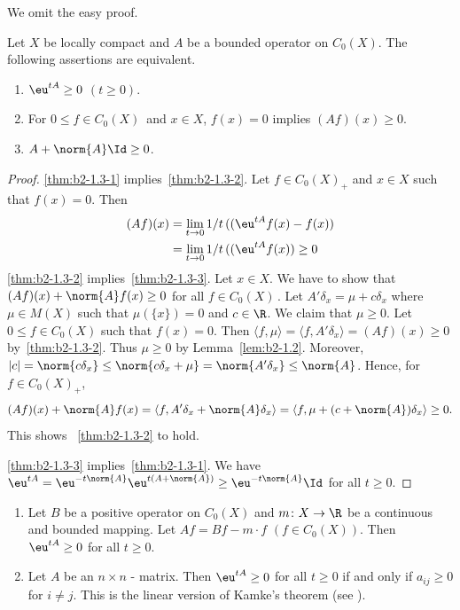 We omit the easy proof.
\begin{theorem}\label{thm:b2-1.3}
Let $X$ be locally compact and $A$ be a bounded operator on $C_{0}(X)$.
The following assertions are equivalent.
\begin{enumerate}[\upshape (a)]
\item \label{thm:b2-1.3-1}
$\eu^{tA} \geq 0$ $(t \geq 0)$.
\item \label{thm:b2-1.3-2}
For  $0 \leq f \in C_{0}(X)$\, and  $x \in X$,  $f(x) = 0$ implies $(Af)(x) \geq 0$.
\item \label{thm:b2-1.3-3}
$A + \norm{A}\Id \geq 0$.
\end{enumerate}
\end{theorem}
\begin{proof}
\ref{thm:b2-1.3-1} implies~\ref{thm:b2-1.3-2}.
Let $f \in C_{0}(X)_{+}$ and $x \in X$ such that $f(x) = 0$.
Then
\begin{align*}
(Af)(x) &= \lim_{t \to 0} 1/t\, ((\eu^{tA}f(x) - f(x)) \\
&= \lim_{t \to 0} 1/t\, ((\eu^{tA}f(x)) \geq 0
\end{align*}
\ref{thm:b2-1.3-2} implies~\ref{thm:b2-1.3-3}.
Let $x \in X$.
We have to show that $(Af)(x) + \norm{A}f(x) \geq 0$ for all $f \in C_{0}(X)$\,.
Let $A'\delta_{x} = \mu + c\delta_{x}$ where $\mu \in M(X)$ such that $\mu(\{x\}) = 0$ and $c \in \R$.
We claim that $\mu \geq 0$.
Let $0 \leq f \in C_{0}(X)$ such that $f(x) = 0$.
Then $\langle f,\mu \rangle = \langle f,A'\delta_{x} \rangle = (Af)(x) \geq 0$ by~\ref{thm:b2-1.3-2}.
Thus $\mu \geq 0$ by Lemma~\ref{lem:b2-1.2}.
Moreover, $|c| = \norm{c\delta_{x}} \leq \norm{c\delta_{x} + \mu} = \norm{A'\delta_{x}} \leq \norm{A}$.
Hence, for $f \in C_{0}(X)_{+}$,
\[
(Af)(x) + \norm{A}f(x) = \langle f, A'\delta_{x} + \norm{A}\delta_{x} \rangle = \langle f, \mu + (c+\norm{A})\delta_{x} \rangle \geq 0.
\]
This shows ~\ref{thm:b2-1.3-2} to hold.

\ref{thm:b2-1.3-3} implies~\ref{thm:b2-1.3-1}.
We have 
$\eu^{tA} = \eu^{-t\norm{A}}\eu^{t(A+\norm{A})} \geq \eu^{-t\norm{A}}\Id$ for all $t \geq 0$.
\end{proof}

\begin{example}\label{ex:b2-1.4} 
 
	\begin{enumerate}[\upshape (i), wide, labelindent=.5ex] 
		\item \label{ex:b2-1.4-1}
		Let $B$ be a positive operator on $C_{0}(X)$ and $m \colon X \to \R$ be a continuous and bounded mapping.
		Let $Af = Bf - m \cdot f$ $(f \in C_{0}(X))$.
		Then $\eu^{tA} \geq 0$ for all $t \geq 0$.
		
		\item \label{ex:b2-1.4-2}
		Let $A$ be an $n \times n$ - matrix.
		Then $\eu^{tA} \geq 0$ for all $t \geq 0$ if and only if\/ $a_{ij} \geq 0$ for $i \neq j$.
		This is the linear version of Kamke's theorem (see \textcite{kamke:1932}).
    \end{enumerate}
\end{example}

